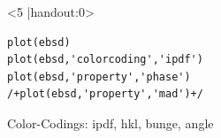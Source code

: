 \begin{frame}[fragile]
\begin{columns}
\begin{column}{8.5cm}
\begin{onlyenv}<5 |handout:0>
\begin{lstlisting}
plot(ebsd)
plot(ebsd,'colorcoding','ipdf')
plot(ebsd,'property','phase')
/+plot(ebsd,'property','mad')+/
\end{lstlisting}
\end{onlyenv}

      Color-Codings: ipdf, hkl, bunge, angle

    \end{column}

    \begin{column}{3.5cm}
\end{column}
\end{columns}
\end{frame}

